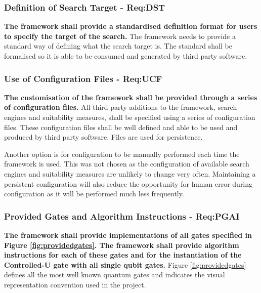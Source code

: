 \subsubsection{Definition of Search Target - Req:DST}
\label{sec:reqdst}
\textbf{The framework shall provide a standardised definition format for users to specify the target of the search.}
The framework needs to provide a standard way of defining what the search target is.
The standard shall be formalised so it is able to be consumed and generated by third party software.

\subsubsection{Use of Configuration Files - Req:UCF}
\label{sec:requcf}
\textbf{The customisation of the framework shall be provided through a series of configuration files.}
All third party additions to the framework, search engines and suitability measures, shall be specified using a series of configuration files.
These configuration files shall be well defined and able to be used and produced by third party software.
Files are used for persistence.

Another option is for configuration to be manually performed each time the framework is used.
This was not chosen as the configuration of available search engines and suitability measures are unlikely to change very often.
Maintaining a persistent configuration will also reduce the opportunity for human error during configuration as it will be performed much less frequently.

\subsubsection{Provided Gates and Algorithm Instructions - Req:PGAI}
\label{sec:reqpgai}
\textbf{The framework shall provide implementations of all gates specified in Figure \ref{fig:providedgates}.
The framework shall provide algorithm instructions for each of these gates and for the instantiation of the Controlled-U gate with all single qubit gates.}
Figure \ref{fig:providedgates} defines all the most well known quantum gates and indicates the visual representation convention used in the project.

